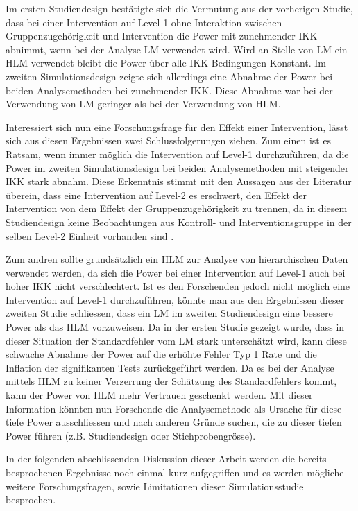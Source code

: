 \documentclass[12pt]{article}\usepackage[]{graphicx}\usepackage[]{color}
\begin{document}
Im ersten Studiendesign bestätigte sich die Vermutung aus der vorherigen Studie, dass bei einer Intervention auf Level-1 ohne Interaktion zwischen Gruppenzugehörigkeit und Intervention die Power mit zunehmender IKK abnimmt, wenn bei der Analyse LM verwendet wird. Wird an Stelle von LM ein HLM verwendet bleibt die Power über alle IKK Bedingungen Konstant. Im zweiten Simulationsdesign zeigte sich allerdings eine Abnahme der Power bei beiden Analysemethoden bei zunehmender IKK. Diese Abnahme war bei der Verwendung von LM geringer als bei der Verwendung von HLM.

Interessiert sich nun eine Forschungsfrage für den Effekt einer Intervention, lässt sich aus diesen Ergebnissen zwei Schlussfolgerungen ziehen. Zum einen ist es Ratsam, wenn immer möglich die Intervention auf Level-1 durchzuführen, da die Power im zweiten Simulationsdesign bei beiden Analysemethoden mit steigender IKK stark abnahm. Diese Erkenntnis stimmt mit den Aussagen aus der Literatur überein, dass eine Intervention auf Level-2 es erschwert, den Effekt der Intervention von dem Effekt der Gruppenzugehörigkeit zu trennen, da in diesem Studiendesign keine Beobachtungen aus Kontroll- und Interventionsgruppe in der selben Level-2 Einheit vorhanden sind \citep{cleary2012studydesign, moerbeek2000design}. 

Zum andren sollte grundsätzlich ein HLM zur Analyse von hierarchischen Daten verwendet werden, da sich die Power bei einer Intervention auf Level-1 auch bei hoher IKK nicht verschlechtert. Ist es den Forschenden jedoch nicht möglich eine Intervention auf Level-1 durchzuführen, könnte man aus den Ergebnissen dieser zweiten Studie schliessen, dass ein LM im zweiten Studiendesign eine bessere Power als das HLM vorzuweisen. Da in der ersten Studie gezeigt wurde, dass in dieser Situation der Standardfehler vom LM stark unterschätzt wird, kann diese schwache Abnahme der Power auf die erhöhte Fehler Typ 1 Rate und die Inflation der signifikanten Tests zurückgeführt werden. Da es bei der Analyse mittels HLM zu keiner Verzerrung der Schätzung des Standardfehlers kommt, kann der Power von HLM mehr Vertrauen geschenkt werden. Mit dieser Information könnten nun Forschende die Analysemethode als Ursache für diese tiefe Power ausschliessen und nach anderen Gründe suchen, die zu dieser tiefen Power führen (z.B. Studiendesign oder Stichprobengrösse).

In der folgenden abschlissenden Diskussion dieser Arbeit werden die bereits besprochenen Ergebnisse noch einmal kurz aufgegriffen und es werden mögliche weitere Forschungsfragen, sowie Limitationen dieser Simulationsstudie besprochen.
\end{document}
